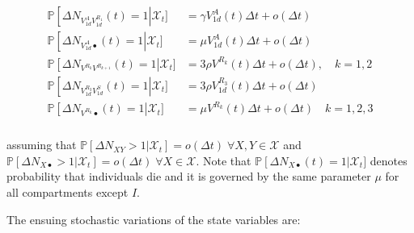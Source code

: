 \begin{gather}
\begin{aligned}
    \mathbb{P}\left[ \Delta N_{V_{1d}^AV_{1d}^{R_1}}(t) = 1 \right|\mathcal{X}_t] &= \gamma V_{1d}^A(t) \Delta t + o(\Delta t)\\
    \mathbb{P}\left[ \Delta N_{V_{1d}^A\bullet}(t) = 1 \right|\mathcal{X}_t] &= \mu  V_{1d}^A(t) \Delta t + o(\Delta t)\\
    \mathbb{P}\left[ \Delta N_{V^{R_k}V^{R_{k+1}}}(t) = 1 \right|\mathcal{X}_t] &= 3\rho V^{R_k}(t) \Delta t + o(\Delta t),\quad k=1,2\\
    \mathbb{P}\left[ \Delta N_{V_{1d}^{R_3}V_{1d}^S}(t) = 1 \right|\mathcal{X}_t] &= 3\rho V_{1d}^{R_3}(t) \Delta t + o(\Delta t)\\
    \mathbb{P}\left[ \Delta N_{V^{R_k}\bullet}(t) = 1 \right|\mathcal{X}_t] &= \mu  V^{R_k}(t) \Delta t + o(\Delta t)\quad k=1,2,3\\
\end{aligned}
\end{gather}

assuming that \(\mathbb{P}[\Delta N_{XY} > 1|\mathcal{X}_t] = o(\Delta t) \; \forall X,Y \in \mathcal{X}\) and \(\mathbb{P}[\Delta N_{X\bullet} > 1|\mathcal{X}_t] = o(\Delta t) \; \forall X \in \mathcal{X}\). Note that \(\mathbb{P}\left[ \Delta N_{X\bullet}(t) = 1 \right|\mathcal{X}_t]\) denotes probability that individuals die and it is governed by the same parameter $\mu$ for all compartments except $I$. 

The ensuing stochastic variations of the state variables are:

